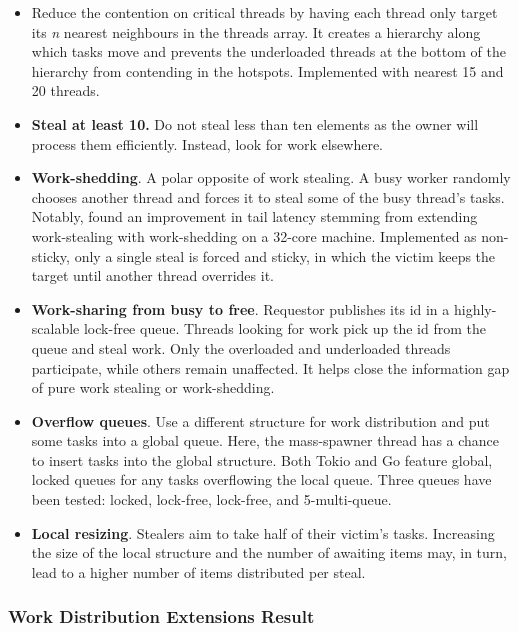 \documentclass[12pt,a4paper,twoside]{report}
\begin{document}
\begin{itemize}
    \item Reduce the contention on critical threads by having each thread only target its \textit{n} nearest neighbours in the threads array. It creates a hierarchy along which tasks move and prevents the underloaded threads at the bottom of the hierarchy from contending in the hotspots. Implemented with nearest 15 and 20 threads.
    \item \textbf{Steal at least 10.} Do not steal less than ten elements as the owner will process them efficiently. Instead, look for work elsewhere. 
    \item \textbf{Work-shedding}. A polar opposite of work stealing. A busy worker randomly chooses another thread and forces it to steal some of the busy thread's tasks. Notably, \cite{workshed} found an improvement in tail latency stemming from extending work-stealing with work-shedding on a 32-core machine. Implemented as non-sticky, only a single steal is forced and sticky, in which the victim keeps the target until another thread overrides it. 
    \item \textbf{Work-sharing from busy to free}. Requestor publishes its id in a highly-scalable lock-free queue. Threads looking for work pick up the id from the queue and steal work. Only the overloaded and underloaded threads participate, while others remain unaffected. It helps close the information gap of pure work stealing or work-shedding.
    \item \textbf{Overflow queues}. Use a different structure for work distribution and put some tasks into a global queue. Here, the mass-spawner thread has a chance to insert tasks into the global structure. Both Tokio \cite{Makingth53:online} and Go \cite{goprocgo14:online} feature global, locked queues for any tasks overflowing the local queue. Three queues have been tested: locked, lock-free, lock-free, and 5-multi-queue. 
    \item \textbf{Local resizing}. Stealers aim to take half of their victim's tasks. Increasing the size of the local structure and the number of awaiting items may, in turn, lead to a higher number of items distributed per steal. 
\end{itemize}

\subsubsection{Work Distribution Extensions Result} 
\label{section:extensions_result}
\end{document}
